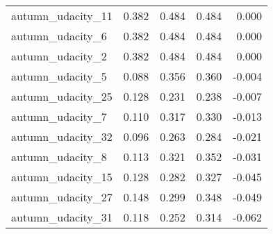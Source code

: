 \begin{tabular}{lrrrr}
autumn\_udacity\_11 &          0.382 &   0.484 &   0.484 &  0.000 \\
autumn\_udacity\_6  &          0.382 &   0.484 &   0.484 &  0.000 \\
autumn\_udacity\_2  &          0.382 &   0.484 &   0.484 &  0.000 \\
autumn\_udacity\_5  &          0.088 &   0.356 &   0.360 & -0.004 \\
autumn\_udacity\_25 &          0.128 &   0.231 &   0.238 & -0.007 \\
autumn\_udacity\_7  &          0.110 &   0.317 &   0.330 & -0.013 \\
autumn\_udacity\_32 &          0.096 &   0.263 &   0.284 & -0.021 \\
autumn\_udacity\_8  &          0.113 &   0.321 &   0.352 & -0.031 \\
autumn\_udacity\_15 &          0.128 &   0.282 &   0.327 & -0.045 \\
autumn\_udacity\_27 &          0.148 &   0.299 &   0.348 & -0.049 \\
autumn\_udacity\_31 &          0.118 &   0.252 &   0.314 & -0.062 \\
\bottomrule
\end{tabular}
